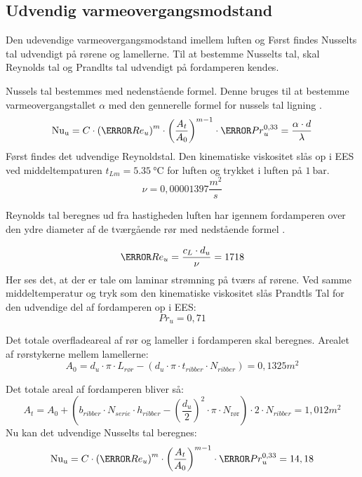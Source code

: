 \documentclass[../Hovedrapport.tex]{subfiles}
\begin{document}
\subsection{Udvendig varmeovergangsmodstand}
    \label{sec:Udvendig varmeovergangsmodstand}
Den udevendige varmeovergangsmodstand imellem luften og Først findes Nusselts tal udvendigt på rørene og lamellerne. Til at bestemme Nusselts tal, skal Reynolds tal og Prandlts tal udvendigt på fordamperen kendes. 

Nussels tal bestemmes med nedenstående formel. Denne bruges til at bestemme varmeovergangstallet $\alpha$ med den gennerelle formel for nussels tal ligning \citep{Noter_Aage}.
\begin{equation}
    \si{Nu_u}  = C \cdot   \left( \V{Re} _{u} \right) ^{m} \cdot   \left(\frac{A_{t}}{A_{0}} \right) ^{m-1}    \cdot  \V{Pr} _{u}^{0,33} = \frac{\alpha \cdot d}{\lambda}
\end{equation}
Først findes det udvendige Reynoldstal. Den kinematiske viskositet slås op i EES ved middeltempaturen $t_{Lm} = \SI{5,35}{\celsius}$ for luften og trykket i luften på $\SI{1}{\bar}$.
\begin{equation}
\si{\nu} = \si{0,00001397}{\frac{m^2}{s}}
\end{equation}

Reynolds tal beregnes ud fra hastigheden luften har igennem fordamperen over den ydre diameter af de tværgående rør med nedstående formel \citep{Noter_Aage}.

\begin{equation}
\V{Re} _{u} =\frac{c_{L} \cdot  d_{u}}{\si{\nu}} = 1718
\end{equation}
Her ses det, at der er tale om laminar strømning på tværs af rørene.
Ved samme middeltemperatur og tryk som den kinematiske viskositet slås Prandtls Tal for den udvendige del af fordamperen op i EES:
\begin{equation}
Pr_{u} = 0,71		 
\end{equation}


Det totale overfladeareal af rør og lameller i fordamperen skal beregnes. Arealet af rørstykerne mellem lamellerne:
\begin{equation}
A_{0} = d_{u} \cdot  \pi \cdot  L_{rør} -  \left( d_{u} \cdot  \pi \cdot  t _{ribber} \cdot  N_{ribber} \right) = \si{0,1325}{m^2}	 
\end{equation}

Det totale areal af fordamperen bliver så:
\begin{equation}
A_{t} = A_{0} +  \left( b_{ribber}\cdot N_{serie}\cdot h_{ribber} -  \left(\frac{d_{u}}{2}\right) ^{2}\cdot \pi\cdot N_{\text{rør}} \right) \cdot 2\cdot N_{ribber	} = \si{1,012}{m^2}	
\end{equation}
Nu kan det udvendige Nusselts tal beregnes:
\begin{equation}
    \si{Nu_u}  = C \cdot   \left( \V{Re} _{u} \right) ^{m} \cdot   \left(\frac{A_{t}}{A_{0}} \right) ^{m-1}    \cdot  \V{Pr} _{u}^{0,33} = 14,18
\end{equation}
\end{document}
